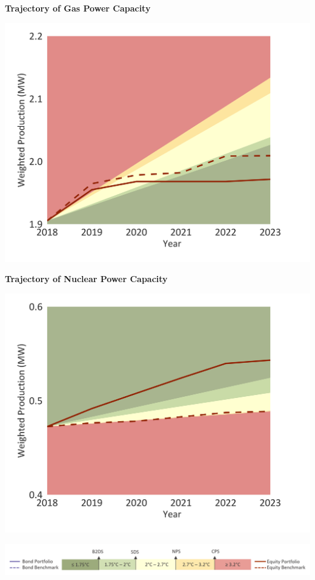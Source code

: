 \documentclass[10pt,table,a4]{article}\usepackage[]{graphicx}\usepackage[]{color}
\begin{document}
	\begin{minipage}[t]{.49\textwidth}
		\textbf{Trajectory of Gas Power Capacity }
		
		\includegraphics[trim = {0 0cm 0 0},width=1\linewidth]{CAFigures/Fig19}
		
		\textbf{Trajectory of Nuclear Power Capacity }
		
		\includegraphics[trim = {0 0cm 0 0},width=1\linewidth]{CAFigures/Fig20}
		
	\end{minipage}
	
	\vspace{-0.6cm}
	\begin{center}
		\includegraphics[trim = {0 0cm 0 0},width=.9\linewidth]{ReportGraphics/246Legend.png}
	\end{center}
	
\end{document}
